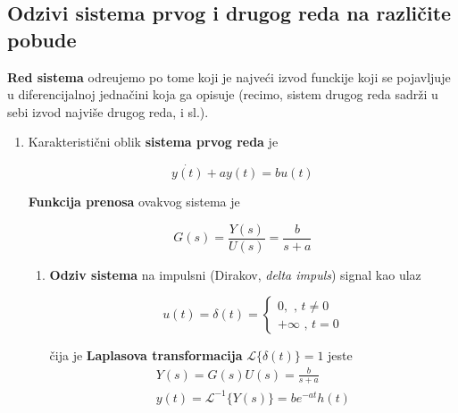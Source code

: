 \documentclass[12pt]{IEEEtran}
\numberwithin{equation}{subsection}
\numberwithin{figure}{section}
\begin{document}
\subsection{\textbf{Odzivi sistema prvog i drugog reda na razli\v{c}ite pobude}}

\textbf{Red sistema} odre\dj{}ujemo po tome koji je najve\'{c}i izvod funckije
koji se pojavljuje u diferencijalnoj jedna\v{c}ini koja ga opisuje (recimo, sistem
drugog reda sadr\v{z}i u sebi izvod najvi\v{s}e drugog reda, i sl.).

\begin{enumerate}
    \item
          Karakteristi\v{c}ni oblik \textbf{sistema prvog reda} je

          \begin{equation}
              \dot{y(t)} + ay(t) = bu(t)
          \end{equation}

          \textbf{Funkcija prenosa} ovakvog sistema je

          \begin{equation}
              G(s) = \frac{Y(s)}{U(s)} = \frac{b}{s + a}
          \end{equation}

          \begin{enumerate}
              \item
                    \textbf{Odziv sistema} na impulsni (Dirakov, \textit{delta impuls}) signal kao ulaz

                    \begin{equation}
                        u(t) = \delta(t) = \begin{cases}
                            0, \text{ , } t \neq 0 \\
                            +\infty \text{ , } t = 0
                        \end{cases}
                    \end{equation}

                    \v{c}ija je \textbf{Laplasova transformacija} $\mathcal{L}\{\delta(t)\} = 1$
                    jeste
                    \begin{gather}
                        Y(s) = G(s)U(s) = \frac{b}{s + a}\\
                        y(t) = \mathcal{L}^{-1}\{Y(s)\} = be^{-at}h(t)
                    \end{gather}


\end{enumerate}
\end{enumerate}
\end{document}
